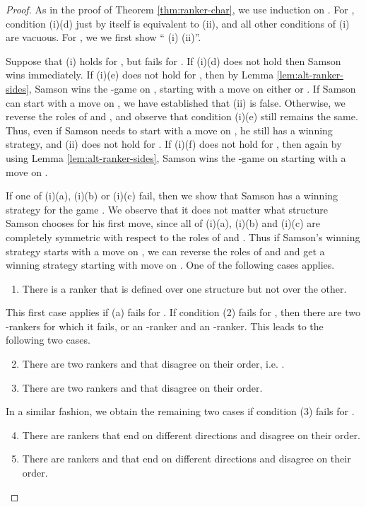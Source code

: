 \documentclass{LMCS}
\begin{document}
\begin{full}
\begin{proof}


  As in the proof of Theorem \ref{thm:ranker-char}, we use induction on .
  For , condition (i)(d) just by itself is equivalent to (ii), and
  all other conditions of (i) are vacuous. For , we we first show
  `` (i)   (ii)''.

  Suppose that (i) holds for , but fails for . If (i)(d)
  does not hold then Samson wins immediately. If (i)(e) does not hold for
  , then by Lemma \ref{lem:alt-ranker-sides}, Samson wins the
  -game on , starting with a move on either  or . If
  Samson can start with a move on , we have established that (ii) is
  false. Otherwise, we reverse the roles of  and , and observe that
  condition (i)(e) still remains the same. Thus, even if Samson needs to
  start with a move on , he still has a winning strategy, and (ii) does
  not hold for . If (i)(f) does not hold for , then again
  by using Lemma \ref{lem:alt-ranker-sides}, Samson wins the -game
  on  starting with a move on .

  If one of (i)(a), (i)(b) or (i)(c) fail, then we show that Samson has a
  winning strategy for
  the game . We observe that it does not matter what
  structure Samson chooses for his first move, since all of (i)(a), (i)(b)
  and (i)(c) are completely symmetric with respect to the roles of  and
  . Thus if Samson's winning strategy starts with a move on , we can
  reverse the roles of  and  and get a winning strategy starting with
  move on . One of the following cases applies.
  \begin{enumerate}[(1)]
  \item There is a ranker  that is defined over one
    structure but not over the other.
  \end{enumerate}
  This first case applies if (a) fails for . If condition (2) fails
  for , then there are two -rankers for which it fails, or an
  -ranker and an -ranker. This leads to the following two cases.
  \begin{enumerate}[(1)]
    \setcounter{enumi}{1}
  \item There are two rankers  and 
    that disagree on their order, i.e. . 
  \item There are two rankers  and 
    that disagree on their order.
  \end{enumerate}
  In a similar fashion, we obtain the remaining two cases if condition (3)
  fails for .
  \begin{enumerate}[(1)]
    \setcounter{enumi}{3}
  \item There are rankers  that end on different
    directions and disagree on their order.
  \item There are rankers  and  that end
    on different directions and disagree on their order.
  \end{enumerate}



\end{proof}
\end{full}
\end{document}

